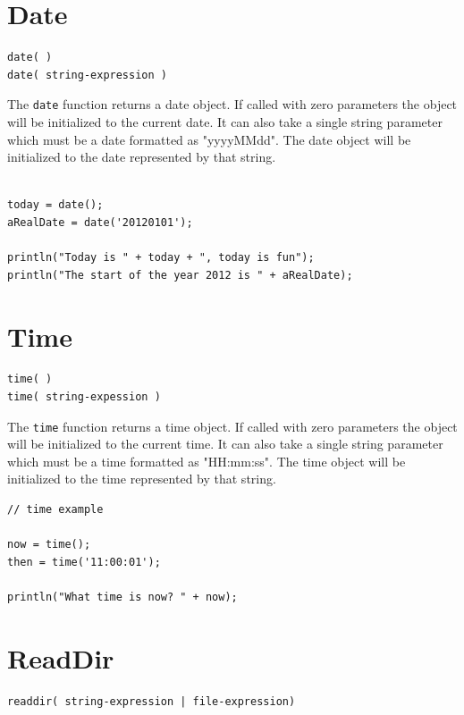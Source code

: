\section{Date}

\begin{verbatim}
date( )
date( string-expression )
\end{verbatim}

The \verb+date+ function returns a date object. If called with zero parameters the object will be initialized to the current date. It can also take a single string parameter which must be a date formatted as "yyyyMMdd". The date object will be initialized to the date represented by that string.

\begin{lstlisting}[caption={Date example}]

today = date();
aRealDate = date('20120101');

println("Today is " + today + ", today is fun");
println("The start of the year 2012 is " + aRealDate);

\end{lstlisting}

\section{Time}

\begin{verbatim}
time( )
time( string-expession )
\end{verbatim}

The \verb+time+ function returns a time object. If called with zero parameters the object will be initialized to the current time. It can also take a single string parameter which must be a time formatted as "HH:mm:ss". The time object will be initialized to the time represented by that string.

\begin{lstlisting}[caption={Time example}]
// time example

now = time();
then = time('11:00:01');

println("What time is now? " + now);

\end{lstlisting}

\section{ReadDir}

\begin{verbatim}
readdir( string-expression | file-expression)
\end{verbatim}

